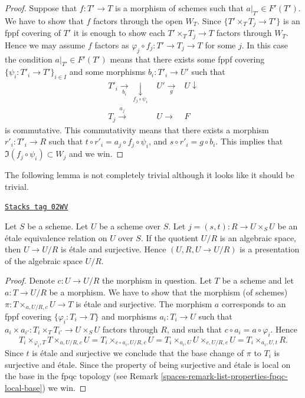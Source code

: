 \begin{proof}
\medskip\noindent
Suppose that $f : T' \to T$ is a morphism of schemes
such that $a|_{T'} \in F'(T')$. We have to show that
$f$ factors through the open $W_T$. Since
$\{T' \times_T T_j \to T'\}$ is an fppf covering of $T'$
it is enough to show each $T' \times_T T_j \to T$
factors through $W_T$. Hence we may assume $f$ factors
as $\varphi_j \circ f_j : T' \to T_j \to T$ for some $j$.
In this case the condition $a|_{T'} \in F'(T')$ means that there exists
some fppf covering $\{\psi_i : T'_i \to T'\}_{i \in I}$ and some
morphisms $b_i : T'_i \to U'$ such that
$$
\begin{array}{ccc}T'_i \underset{b_i}{\longrightarrow}\underset{f_j \circ \psi_i}{\downarrow} & U' \underset{g}{\longrightarrow} & U \downarrow \\ T_j \overset{a_j}{\longrightarrow} & U \longrightarrow & F\end{array}
$$
is commutative. This commutativity means that there exists a
morphism $r'_i : T'_i \to R$ such that
$t \circ r'_i = a_j \circ f_j \circ \psi_i$, and
$s \circ r'_i = g \circ b_i$. This implies that
$\Im(f_j \circ \psi_i) \subset W_j$ and we win.
\end{proof}

The following lemma is not completely trivial although it looks
like it should be trivial.

\begin{lemma}
\label{spaces-lemma-when-it-works-it-works}
\href{https://stacks.math.columbia.edu/tag/02WV}{\texttt{Stacks tag 02WV}}

Let $S$ be a scheme. Let $U$ be a scheme over $S$.
Let $j = (s, t) : R \to U \times_S U$
be an \'etale equivalence relation on $U$ over $S$.
If the quotient $U/R$ is an algebraic space, then
$U \to U/R$ is \'etale and surjective. Hence
$(U, R, U \to U/R)$ is a presentation of the algebraic
space $U/R$.
\end{lemma}

\begin{proof}

Denote $c : U \to U/R$ the morphism in question.
Let $T$ be a scheme and let $a : T \to U/R$ be a morphism.
We have to show that the morphism (of schemes)
$\pi : T \times_{a, U/R, c} U \to T$ is \'etale and surjective.
The morphism $a$ corresponds to an fppf covering
$\{\varphi_i : T_i \to T\}$ and morphisms $a_i : T_i \to U$ such
that
$a_i \times a_{i'} : T_i \times_T T_{i'} \to U \times_S U$
factors through $R$, and such that $c \circ a_i = a \circ \varphi_i$.
Hence
$$
T_i \times_{\varphi_i, T} T \times_{a, U/R, c} U =
T_i \times_{c \circ a_i, U/R, c} U =
T_i \times_{a_i, U} U \times_{c, U/R, c} U = T_i \times_{a_i, U, t} R.
$$
Since $t$ is \'etale and surjective we conclude that
the base change of $\pi$ to $T_i$ is surjective and \'etale.
Since the property of being surjective and \'etale is local
on the base in the fpqc topology (see
Remark \ref{spaces-remark-list-properties-fpqc-local-base})
we win.
\end{proof}

